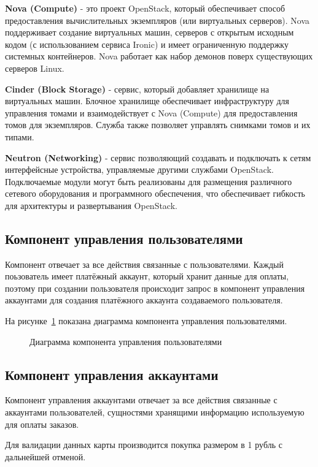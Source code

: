 \textbf{Nova (Compute)} - это проект OpenStack, который обеспечивает способ предоставления вычислительных экземпляров (или виртуальных серверов). Nova поддерживает создание виртуальных машин, серверов с открытым исходным кодом (с использованием сервиса Ironic) и имеет ограниченную поддержку системных контейнеров. Nova работает как набор демонов поверх существующих серверов Linux.

\textbf{Cinder (Block Storage)} - сервис, который добавляет хранилище на виртуальных машин. Блочное хранилище обеспечивает инфраструктуру для управления томами и взаимодействует с Nova (Compute) для предоставления томов для экземпляров. Служба также позволяет управлять снимками томов и их типами.

\textbf{Neutron (Networking)} - сервис позволяющий создавать и подключать к сетям интерфейсные устройства, управляемые другими службами OpenStack. Подключаемые модули могут быть реализованы для размещения различного сетевого оборудования и программного обеспечения, что обеспечивает гибкость для архитектуры и развертывания OpenStack.

\subsection{Компонент управления пользователями}\label{sec:subs4}
Компонент отвечает за все действия связанные с пользователями. Каждый поьзователь имеет платёжный аккаунт, который хранит данные для оплаты, поэтому при создании пользователя происходит запрос в компонент управления аккаунтами для создания платёжного аккаунта создаваемого пользователя.


На рисунке~\ref{fig:users_control_scheme} показана диаграмма компонента управления пользователями.
\begin{figure}[ht]
  \caption{Диаграмма компонента управления пользователями}\label{fig:users_control_scheme}
\end{figure}


\subsection{Компонент управления аккаунтами}\label{sec:subs5}
Компонент управления аккаунтами отвечает за все действия связанные с аккаунтами пользователей, сущностями хранящими информацию используемую для оплаты заказов. 

Для валидации данных карты производится покупка размером в 1 рубль с дальнейшей отменой.


